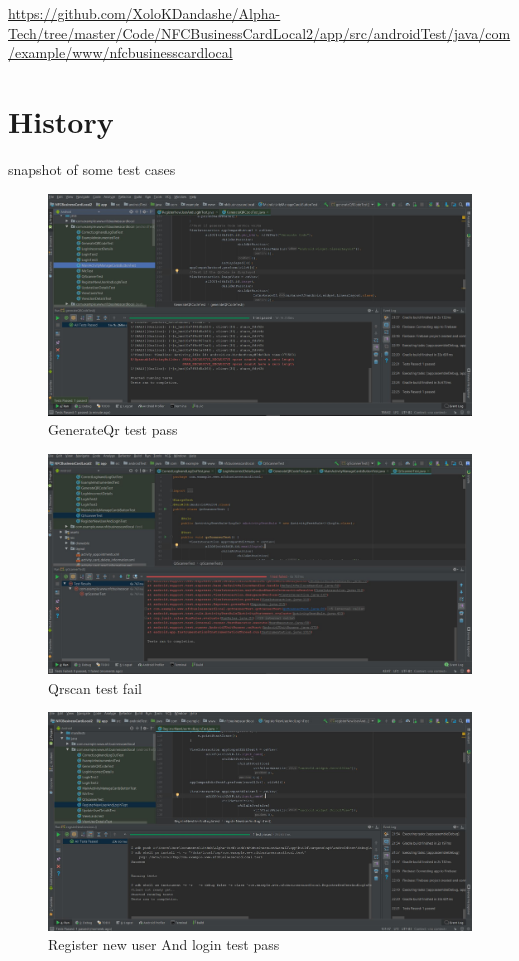 \documentclass[english]{article}
\begin{document}
					\href{url}{https://github.com/XoloKDandashe/Alpha-Tech/tree/master/Code/NFCBusinessCardLocal2/app/src/androidTest/java/com/example/www/nfcbusinesscardlocal}
	\section{History}
	snapshot of some test cases
\begin{figure}[h!]
				\centering
			\includegraphics[scale=0.7]{Capture.jpg}
				\caption{GenerateQr test pass}
				\label{figure: 1}
			\end{figure}
\begin{figure}
				\centering
			\includegraphics[scale=0.7]{QrscanFail.jpg}
				\caption{Qrscan test fail}
				\label{figure: 1}
			\end{figure}
\begin{figure}
				\centering
			\includegraphics[scale=0.7]{RegisterTest.jpg}
				\caption{Register new user And login test pass}
				\label{figure: 1}
			\end{figure}


	
	
		
\end{document}

